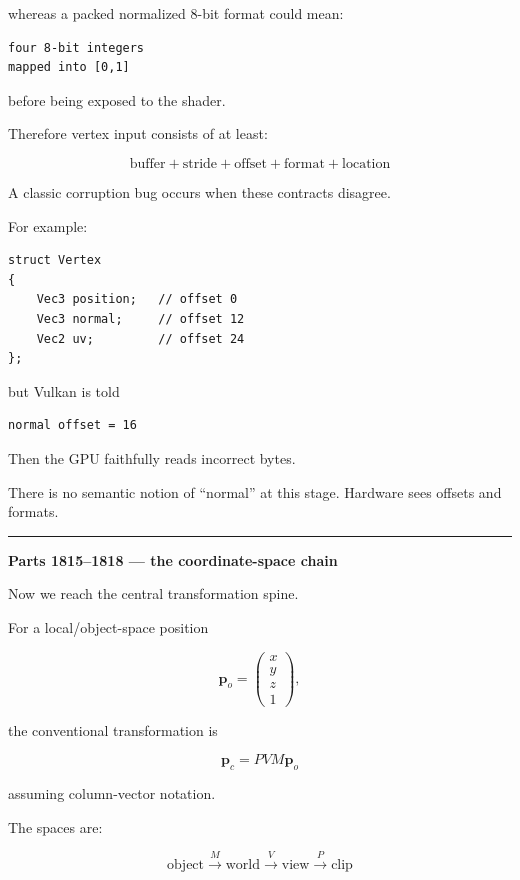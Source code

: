 whereas a packed normalized 8-bit format could mean:

\begin{verbatim}
four 8-bit integers
mapped into [0,1]
\end{verbatim}

before being exposed to the shader.

Therefore vertex input consists of at least:

\[
\boxed{\text{buffer}+\text{stride}+\text{offset}+\text{format}+\text{location}}
\]

A classic corruption bug occurs when these contracts disagree.

For example:

\begin{verbatim}
struct Vertex
{
    Vec3 position;   // offset 0
    Vec3 normal;     // offset 12
    Vec2 uv;         // offset 24
};
\end{verbatim}

but Vulkan is told

\begin{verbatim}
normal offset = 16
\end{verbatim}

Then the GPU faithfully reads incorrect bytes.

There is no semantic notion of ``normal'' at this stage. Hardware sees offsets and formats.

\begin{center}\rule{0.5\linewidth}{0.5pt}\end{center}

\textbf{Parts 1815--1818 --- the coordinate-space chain}

Now we reach the central transformation spine.

For a local/object-space position

\[
\mathbf p_o=
\begin{pmatrix}
x\\y\\z\\1
\end{pmatrix},
\]

the conventional transformation is

\[
\boxed{
\mathbf p_c
=
PVM\mathbf p_o
}
\]

assuming column-vector notation.

The spaces are:

\[
\boxed{
\text{object}
\xrightarrow{M}
\text{world}
\xrightarrow{V}
\text{view}
\xrightarrow{P}
\text{clip}
}
\]

